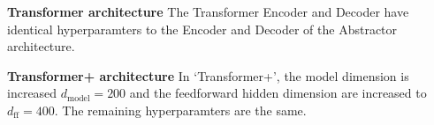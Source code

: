 \textbf{Transformer architecture} The Transformer Encoder and Decoder have identical hyperparamters to the Encoder and Decoder of the Abstractor architecture.

\textbf{Transformer+ architecture} In `Transformer+', the model dimension is increased $d_\mathrm{model} = 200$ and the feedforward hidden dimension are increased to $d_{\mathrm{ff}} = 400$. The remaining hyperparamters are the same.